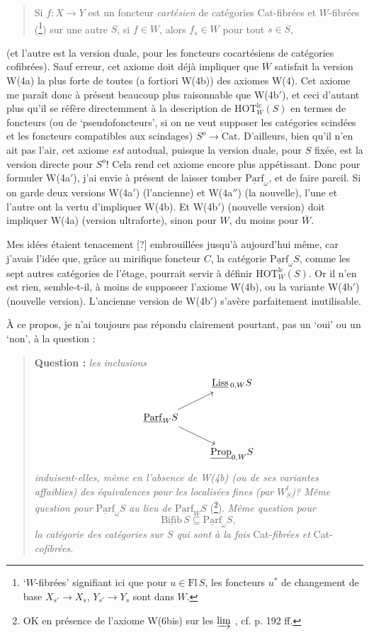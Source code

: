 \documentclass[11pt]{article}
\newcommand{\printedpage}[1]{\marginpar{\footnotesize p.~#1}}
\newcommand{\msp}[1]{\marginpar{\footnotesize [#1]}}
\newcommand{\HOT}{\mathrm{HOT}}
\newcommand{\Liss}{\underline{\mathrm{Liss}}\,}
\newcommand{\Parf}{\underline{\mathrm{Parf}}}
\newcommand{\Prop}{\underline{\mathrm{Prop}}}
\newcommand{\Bifib}{\underline{\mathrm{Bifib}}}
\begin{document}
\begin{quote}
Si $f : X \longrightarrow Y$ est un foncteur \textit{cartésien} de catégories Cat-fibrées et $W$-fibrées (\footnote{‘$W$-fibrées’ signifiant ici que pour $u \in \mathrm{Fl}\,S$, les foncteurs $u^*$ de changement de base $X_{s'} \longrightarrow X_s$, $Y_{s'} \longrightarrow Y_s$ sont dans $W$.}) sur une autre $S$, si $f \in W$, alors $f_s \in W$ pour tout $s \in S$,
\end{quote}

(et l'autre est la version duale, pour les foncteurs cocartésiens de catégories cofibrées). Sauf erreur, cet axiome doit déjà impliquer que $\overline{W}$ satisfait la version W(4a) la plus forte
\printedpage{115}
de toutes (a fortiori W(4b)) des axiomes W(4). Cet axiome me paraît donc à présent beaucoup plus raisonnable que W(4b$'$), et ceci d'autant plus qu'il se réfère directemment à la description de $\HOT^{\mathrm{lc}}_W(S)$ en termes de foncteurs (ou de ‘pseudofoncteurs’, si on ne veut supposer les catégories scindées et les foncteurs compatibles aux scindages) $S^{o} \longrightarrow \mathrm{Cat}$. %
D'ailleurs, bien qu'il n'en ait pas l'air, cet axiome \textit{est} autodual, puisque la version duale, pour $S$ fixée, est la version directe pour $S^{o}$! Cela rend cet axiome encore plus appétissant. Donc pour formuler W(4a$'$), j'ai envie à présent de laisser tomber $\Parf_\omega$, et de faire pareil. Si on garde deux versions W(4a$'$) (l'ancienne) et W(4a$''$) (la nouvelle), l'une et l'autre ont la vertu d'impliquer W(4b). Et W(4b$'$) (nouvelle version) doit impliquer W(4a) (version ultraforte), sinon pour $W$, du moins pour $\overline{W}$.

Mes idées étaient tenacement [?] embrouillées
\msp{page 186}
jusqu'à aujourd'hui même, car j'avais l'idée que, grâce au mirifique foncteur $C$, la catégorie $\Parf_\omega S$, comme les sept autres catégories de l'étage, pourrait servir à définir $\HOT^{\mathrm{lc}}_W(S)$. Or il n'en est rien, semble-t-il, à moins de supposeer l'axiome W(4b), ou la variante W(4b$'$) (nouvelle version). L'ancienne version de W(4b$'$) s'avère parfaitement inutilisable. %

À ce propos, je n'ai toujours pas répondu clairement pourtant, pas un ‘oui’ ou un ‘non’, à la question :

\begin{quote}
\textbf{Question :} \textit{les inclusions}
\[
\begin{tikzcd}
 & \Liss_{0,W}S \\
\Parf_W S \arrow[ur] \arrow[dr] & \\
 & \Prop_{0,W}S
\end{tikzcd}
\]
\textit{induisent-elles, même en l'absence de W(4b) (ou de ses variantes affaiblies) des équivalences pour les localisées fines (par $W^{\mathrm{f}}_S$)? Même question pour} $\Parf_\omega S$ \textit{au lieu de} $\Parf_W S$ (\footnote{OK en présence de l'axiome W(6bis) sur les $\varinjlim$ , cf. p. 192 ff.}). \textit{Même question pour}
\[ \Bifib\, S \subseteq \Parf_\omega S, \]
\textit{la catégorie des catégories sur $S$ qui sont à la fois} Cat-\textit{fibrées et} Cat-\textit{cofibrées.}
\end{quote}
\end{document}
